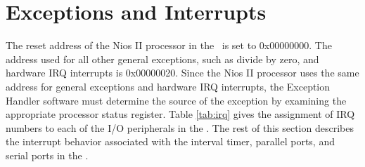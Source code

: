 \section{Exceptions and Interrupts}
\label{sec:exceptions}

The reset address of the Nios II processor in the \systemName~is set to
{\sf 0x00000000}. The address used for all other general exceptions, such as 
divide by zero, and hardware IRQ interrupts 
is {\sf 0x00000020}. Since the Nios II processor uses the same address for general
exceptions and hardware IRQ interrupts, the
Exception Handler software must determine the source of the exception by examining the
appropriate processor status register. Table \ref{tab:irq}
gives the assignment of IRQ numbers to each of the I/O peripherals in the \systemName.
The rest of this section describes the interrupt behavior associated with the interval
timer, parallel ports, and serial ports in the \systemName. 


